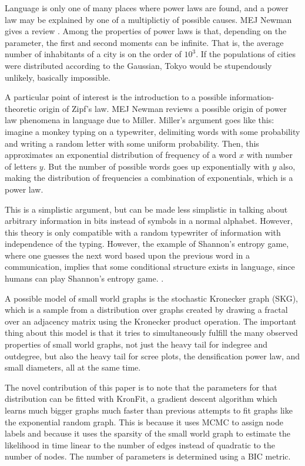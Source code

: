 \documentclass[12pt]{article}
\begin{document}
Language is only one of many places where power laws are found, and a power law may be explained by one of a multiplictiy of possible causes. MEJ Newman gives a review \cite{mejpowerlaw}. Among the properties of power laws is that, depending on the parameter, the first and second moments can be infinite. That is, the average number of inhabitants of a city is on the order of $10^3$. If the populations of cities were distributed according to the Gaussian, Tokyo would be stupendously unlikely, basically impossible.

A particular point of interest is the introduction to a possible information-theoretic origin of Zipf's law. MEJ Newman reviews a possible origin of power law phenomena in language due to Miller\cite{gamiller}. Miller's argument goes like this: imagine a monkey typing on a typewriter, delimiting words with some probability and writing a random letter with some uniform probability. Then, this approximates an exponential distribution of frequency of a word $x$ with number of letters $y$. But the number of possible words goes up exponentially with $y$ also, making the distribution of frequencies a combination of exponentials, which is a power law.

This is a simplistic argument, but can be made less simplistic in talking about arbitrary information in bits instead of symbols in a normal alphabet. However, this theory is only compatible with a random typewriter of information with independence of the typing. However, the example of Shannon's entropy game, where one guesses the next word based upon the previous word in a communication, implies that some conditional structure exists in language, since humans can play Shannon's entropy game. \cite{shannon}
. 

A possible model of small world graphs is the stochastic Kronecker graph (SKG)\cite{kronfit}, which is a sample from a distribution over graphs created by drawing a fractal over an adjacency matrix using the Kronecker product operation. The important thing about this model is that it tries to simultaneously fulfill the many observed properties of small world graphs, not just the heavy tail for indegree and outdegree, but also the heavy tail for scree plots, the densification power law, and small diameters, all at the same time.

The novel contribution of this paper is to note that the parameters for that distribution can be fitted with KronFit, a gradient descent algorithm which learns much bigger graphs much faster than previous attempts to fit graphs like the exponential random graph. This is because it uses MCMC to assign node labels and because it uses the sparsity of the small world graph to estimate the likelihood in time linear to the number of edges instead of quadratic to the number of nodes. The number of parameters is determined using a BIC metric.
\end{document}
